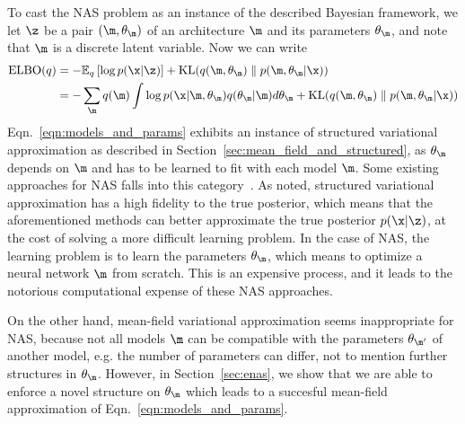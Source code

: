To cast the NAS problem as an instance of the described Bayesian framework, we
let $\z$ be a pair $(\m, \theta_{\m})$ of an architecture $\m$ and its
parameters $\theta_{\m}$, and note that $\m$ is a discrete latent variable. Now
we can write
\begin{align}
  \text{ELBO}(q)
    &= -\mathbb{E}_q \left[ \log{p(\x | \z)} \right]
     + \text{KL}(q(\m, \theta_\m) \parallel p(\m, \theta_\m | \x)) \\
    \label{eqn:models_and_params}
    &= -\sum_{\m} q(\m) \int{\log{p(\x | \m, \theta_\m)} q(\theta_{\m} | \m) d\theta_{\m}}
     + \text{KL}(q(\m, \theta_\m) \parallel p(\m, \theta_\m | \x))
\end{align}
Eqn.~\ref{eqn:models_and_params} exhibits an instance of structured variational
approximation as described in Section~\ref{sec:mean_field_and_structured}, as
$\theta_\m$ depends on $\m$ and has to be learned to fit with each model $\m$.
Some existing approaches for NAS falls into this
category~\citep{nas,nas_module,nas_dqn,nas_module_dqn}. As noted, structured
variational approximation has a high fidelity to the true posterior, which
means that the aforementioned methods can better approximate the true posterior
$p(\x | \z)$, at the cost of solving a more difficult learning problem. In the
case of NAS, the learning problem is to learn the parameters $\theta_\m$, which
means to optimize a neural network $\m$ from scratch. This is an expensive
process, and it leads to the notorious computational expense of these NAS
approaches.

On the other hand, mean-field variational approximation seems inappropriate for
NAS, because not all models $\m$ can be compatible with the parameters
$\theta_{\m'}$ of another model, e.g. the number of parameters can differ, not
to mention further structures in $\theta_\m$. However, in
Section~\ref{sec:enas}, we show that we are able to enforce a novel structure
on $\theta_\m$ which leads to a succesful mean-field approximation of
Eqn.~\ref{eqn:models_and_params}.